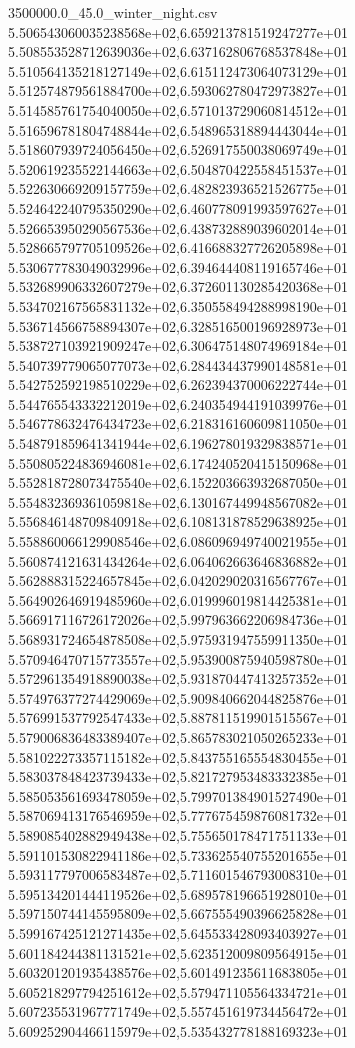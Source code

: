 \begin{filecontents*}{3500000.0_45.0_winter_night.csv}
5.506543060035238568e+02,6.659213781519247277e+01
5.508553528712639036e+02,6.637162806768537848e+01
5.510564135218127149e+02,6.615112473064073129e+01
5.512574879561884700e+02,6.593062780472973827e+01
5.514585761754040050e+02,6.571013729060814512e+01
5.516596781804748844e+02,6.548965318894443044e+01
5.518607939724056450e+02,6.526917550038069749e+01
5.520619235522144663e+02,6.504870422558451537e+01
5.522630669209157759e+02,6.482823936521526775e+01
5.524642240795350290e+02,6.460778091993597627e+01
5.526653950290567536e+02,6.438732889039602014e+01
5.528665797705109526e+02,6.416688327726205898e+01
5.530677783049032996e+02,6.394644408119165746e+01
5.532689906332607279e+02,6.372601130285420368e+01
5.534702167565831132e+02,6.350558494288998190e+01
5.536714566758894307e+02,6.328516500196928973e+01
5.538727103921909247e+02,6.306475148074969184e+01
5.540739779065077073e+02,6.284434437990148581e+01
5.542752592198510229e+02,6.262394370006222744e+01
5.544765543332212019e+02,6.240354944191039976e+01
5.546778632476434723e+02,6.218316160609811050e+01
5.548791859641341944e+02,6.196278019329838571e+01
5.550805224836946081e+02,6.174240520415150968e+01
5.552818728073475540e+02,6.152203663932687050e+01
5.554832369361059818e+02,6.130167449948567082e+01
5.556846148709840918e+02,6.108131878529638925e+01
5.558860066129908546e+02,6.086096949740021955e+01
5.560874121631434264e+02,6.064062663646836882e+01
5.562888315224657845e+02,6.042029020316567767e+01
5.564902646919485960e+02,6.019996019814425381e+01
5.566917116726172026e+02,5.997963662206984736e+01
5.568931724654878508e+02,5.975931947559911350e+01
5.570946470715773557e+02,5.953900875940598780e+01
5.572961354918890038e+02,5.931870447413257352e+01
5.574976377274429069e+02,5.909840662044825876e+01
5.576991537792547433e+02,5.887811519901515567e+01
5.579006836483389407e+02,5.865783021050265233e+01
5.581022273357115182e+02,5.843755165554830455e+01
5.583037848423739433e+02,5.821727953483332385e+01
5.585053561693478059e+02,5.799701384901527490e+01
5.587069413176546959e+02,5.777675459876081732e+01
5.589085402882949438e+02,5.755650178471751133e+01
5.591101530822941186e+02,5.733625540755201655e+01
5.593117797006583487e+02,5.711601546793008310e+01
5.595134201444119526e+02,5.689578196651928010e+01
5.597150744145595809e+02,5.667555490396625828e+01
5.599167425121271435e+02,5.645533428093403927e+01
5.601184244381131521e+02,5.623512009809564915e+01
5.603201201935438576e+02,5.601491235611683805e+01
5.605218297794251612e+02,5.579471105564334721e+01
5.607235531967771749e+02,5.557451619734456472e+01
5.609252904466115979e+02,5.535432778188169323e+01

\end{filecontents*}
